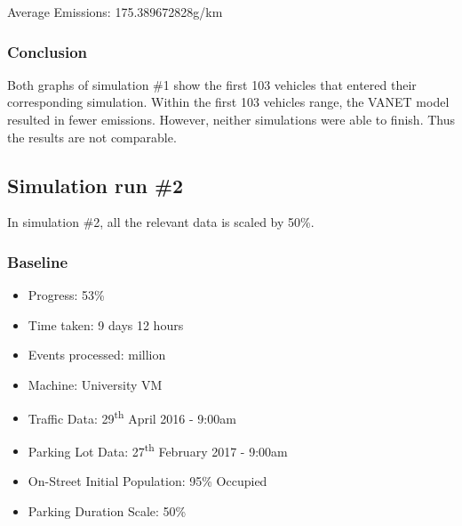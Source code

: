 Average Emissions: 175.389672828g/km

\subsubsection{Conclusion}
Both graphs of simulation \#1 show the first 103 vehicles that entered their corresponding simulation. Within the first 103 vehicles range, the \ac{VANET} model resulted in fewer emissions. However, neither simulations were able to finish. Thus the results are not comparable.

\pagebreak

\subsection{Simulation run \#2}
In simulation \#2, all the relevant data is scaled by 50\%. 
\subsubsection{Baseline}
\begin{itemize}
    \setlength\itemsep{0em}
    \item Progress: 53\%
    \item Time taken: 9 days 12 hours
    \item Events processed:  million
    \item Machine: University VM
    \item Traffic Data: 29\textsuperscript{th} April 2016 - 9:00am
    \item Parking Lot Data: 27\textsuperscript{th} February 2017 - 9:00am
    \item On-Street Initial Population: 95\% Occupied
    \item Parking Duration Scale: 50\%
\end{itemize}

